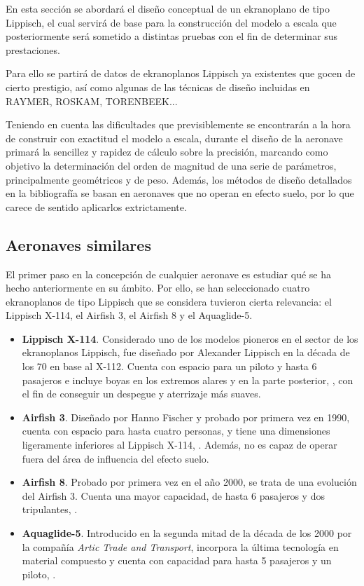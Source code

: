 En esta sección se abordará el diseño conceptual de un ekranoplano de tipo Lippisch, el cual servirá de base para la construcción del modelo a escala que posteriormente será sometido a distintas pruebas con el fin de determinar sus prestaciones.

Para ello se partirá de datos de ekranoplanos Lippisch ya existentes que gocen de cierto prestigio, así como algunas de las técnicas de diseño incluidas en RAYMER, ROSKAM, TORENBEEK...

Teniendo en cuenta las dificultades que previsiblemente se encontrarán a la hora de construir con exactitud el modelo a escala, durante el diseño de la aeronave primará la sencillez y rapidez de cálculo sobre la precisión, marcando como objetivo la determinación del orden de magnitud de una serie de parámetros, principalmente geométricos y de peso. Además, los métodos de diseño detallados en la bibliografía se basan en aeronaves que no operan en efecto suelo, por lo que carece de sentido aplicarlos extrictamente.


\subsection{Aeronaves similares}
\label{sec:design:similar}

El primer paso en la concepción de cualquier aeronave es estudiar qué se ha hecho anteriormente en su ámbito. Por ello, se han seleccionado cuatro ekranoplanos de tipo Lippisch que se considera tuvieron cierta relevancia: el Lippisch X-114, el Airfish 3, el Airfish 8 y el Aquaglide-5.

\begin{itemize}
\item \textbf{Lippisch X-114}. Considerado uno de los modelos pioneros en el sector de los ekranoplanos Lippisch, fue diseñado por Alexander Lippisch en la década de los 70 en base al X-112. Cuenta con espacio para un piloto y hasta 6 pasajeros e incluye boyas en los extremos alares y en la parte posterior, , con el fin de conseguir un despegue y aterrizaje más suaves.
\item \textbf{Airfish 3}. Diseñado por Hanno Fischer y probado por primera vez en 1990, cuenta con espacio para hasta cuatro personas, y tiene una dimensiones ligeramente inferiores al Lippisch X-114, . Además, no es capaz de operar fuera del área de influencia del efecto suelo.
\item \textbf{Airfish 8}. Probado por primera vez en el año 2000, se trata de una evolución del Airfish 3. Cuenta una mayor capacidad, de hasta 6 pasajeros y dos tripulantes, .
\item \textbf{Aquaglide-5}. Introducido en la segunda mitad de la década de los 2000 por la compañía \emph{Artic Trade and Transport}, incorpora la última tecnología en material compuesto y cuenta con capacidad para hasta 5 pasajeros y un piloto, .
\end{itemize}


